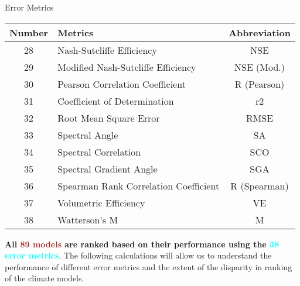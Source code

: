 \documentclass[xcolor={dvipsnames}]{beamer}
\begin{document}
\begin{frame}{Error Metrics}

\begin{center}
\begin{tabular}{|>{\tiny}c|>{\tiny}l|>{\tiny}c|}
\hline
\textbf{Number} & \textbf{Metrics} & \textbf{Abbreviation} \\
\hline
28 & Nash-Sutcliffe Efficiency & NSE \\
29 & Modified Nash-Sutcliffe Efficiency & NSE (Mod.) \\
30 & Pearson Correlation Coefficient & R (Pearson) \\
31 & Coefficient of Determination & r2 \\
32 & Root Mean Square Error & RMSE \\
33 & Spectral Angle & SA \\
34 & Spectral Correlation & SCO \\
35 & Spectral Gradient Angle & SGA \\
36 & Spearman Rank Correlation Coefficient & R (Spearman) \\
37 & Volumetric Efficiency & VE \\
38 & Watterson's M & M \\
\hline
\end{tabular}
\end{center}

\textbf{All \textcolor{brown}{89 models} are ranked based on their performance using the \textcolor{cyan}{38 error metrics}}. The following calculations will allow us to understand the performance of different error metrics and the extent of the disparity in ranking of the climate models.

\end{frame}
\end{document}
